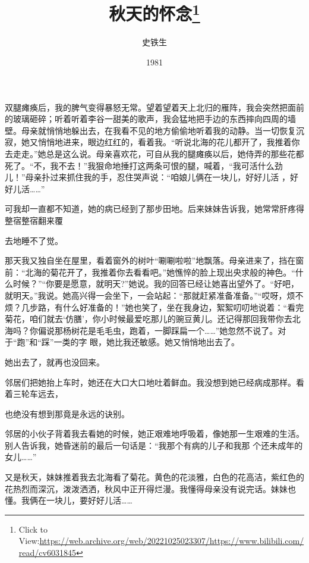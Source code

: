 \documentclass{article}
\title{秋天的怀念\footnote{Click to View:\url{https://web.archive.org/web/20221025023307/https://www.bilibili.com/read/cv6031845}}}
\author{史铁生}
\date{1981}
\begin{document}

\maketitle


\Large

﻿双腿瘫痪后，我的脾气变得暴怒无常。望着望着天上北归的雁阵，我会突然把面前的玻璃砸碎；听着听着李谷一甜美的歌声，我会猛地把手边的东西摔向四周的墙壁。母亲就悄悄地躲出去，在我看不见的地方偷偷地听着我的动静。当一切恢复沉寂，她又悄悄地进来，眼边红红的，看着我。“听说北海的花儿都开了，我推着你去走走。”她总是这么说。母亲喜欢花，可自从我的腿瘫痪以后，她侍弄的那些花都死了。“不，我不去！”我狠命地捶打这两条可恨的腿，喊着，“我可活什么劲儿！”母亲扑过来抓住我的手，忍住哭声说：“咱娘儿俩在一块儿，好好儿活
，好好儿活……” 

可我却一直都不知道，她的病已经到了那步田地。后来妹妹告诉我，她常常肝疼得整宿整宿翻来覆
\newpage

去地睡不了觉。 

那天我又独自坐在屋里，看着窗外的树叶“唰唰啦啦”地飘落。母亲进来了，挡在窗前：“北海的菊花开了，我推着你去看看吧。”她憔悴的脸上现出央求般的神色。“什么时候？”“你要是愿意，就明天?”她说。我的回答已经让她喜出望外了。“好吧，就明天。”我说。她高兴得一会坐下，一会站起：“那就赶紧准备准备。”“哎呀，烦不烦？几步路，有什么好准备的！”她也笑了，坐在我身边，絮絮叨叨地说着：“看完菊花，咱们就去‘仿膳’，你小时候最爱吃那儿的豌豆黄儿。还记得那回我带你去北海吗？你偏说那杨树花是毛毛虫，跑着，一脚踩扁一个……”她忽然不说了。对于“跑”和“踩”一类的字
眼，她比我还敏感。她又悄悄地出去了。 


她出去了，就再也没回来。 

邻居们把她抬上车时，她还在大口大口地吐着鲜血。我没想到她已经病成那样。看着三轮车远去，

\newpage
也绝没有想到那竟是永远的诀别。 

邻居的小伙子背着我去看她的时候，她正艰难地呼吸着，像她那一生艰难的生活。别人告诉我，她昏迷前的最后一句话是：“我那个有病的儿子和我那
个还未成年的女儿……” 

又是秋天，妹妹推着我去北海看了菊花。黄色的花淡雅，白色的花高洁，紫红色的花热烈而深沉，泼泼洒洒，秋风中正开得烂漫。我懂得母亲没有说完话。妹妹也懂。我俩在一块儿，要好好儿活……
\end{document}
